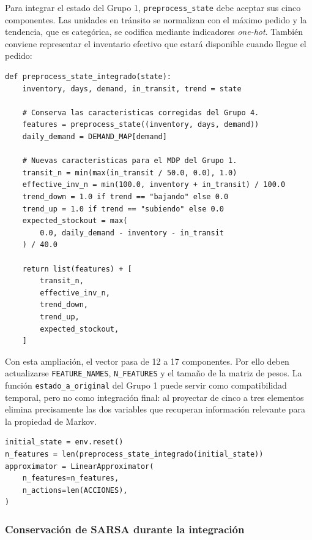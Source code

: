 \documentclass[11pt,letterpaper]{article}
\begin{document}
Para integrar el estado del Grupo 1, \texttt{preprocess\_state} debe aceptar sus
cinco componentes. Las unidades en tránsito se normalizan con el máximo pedido
y la tendencia, que es categórica, se codifica mediante indicadores
\emph{one-hot}. También conviene representar el inventario efectivo que estará
disponible cuando llegue el pedido:

\begin{lstlisting}[caption={Preprocesamiento del estado unificado de cinco elementos}]
def preprocess_state_integrado(state):
    inventory, days, demand, in_transit, trend = state

    # Conserva las caracteristicas corregidas del Grupo 4.
    features = preprocess_state((inventory, days, demand))
    daily_demand = DEMAND_MAP[demand]

    # Nuevas caracteristicas para el MDP del Grupo 1.
    transit_n = min(max(in_transit / 50.0, 0.0), 1.0)
    effective_inv_n = min(100.0, inventory + in_transit) / 100.0
    trend_down = 1.0 if trend == "bajando" else 0.0
    trend_up = 1.0 if trend == "subiendo" else 0.0
    expected_stockout = max(
        0.0, daily_demand - inventory - in_transit
    ) / 40.0

    return list(features) + [
        transit_n,
        effective_inv_n,
        trend_down,
        trend_up,
        expected_stockout,
    ]
\end{lstlisting}

Con esta ampliación, el vector pasa de 12 a 17 componentes. Por ello deben
actualizarse \texttt{FEATURE\_NAMES}, \texttt{N\_FEATURES} y el tamaño de la
matriz de pesos. La función \texttt{estado\_a\_original} del Grupo 1 puede servir
como compatibilidad temporal, pero no como integración final: al proyectar de
cinco a tres elementos elimina precisamente las dos variables que recuperan
información relevante para la propiedad de Markov.

\begin{lstlisting}[caption={Inicialización coherente del aproximador}]
initial_state = env.reset()
n_features = len(preprocess_state_integrado(initial_state))
approximator = LinearApproximator(
    n_features=n_features,
    n_actions=len(ACCIONES),
)
\end{lstlisting}

\subsubsection*{Conservación de SARSA durante la integración}
\end{document}
